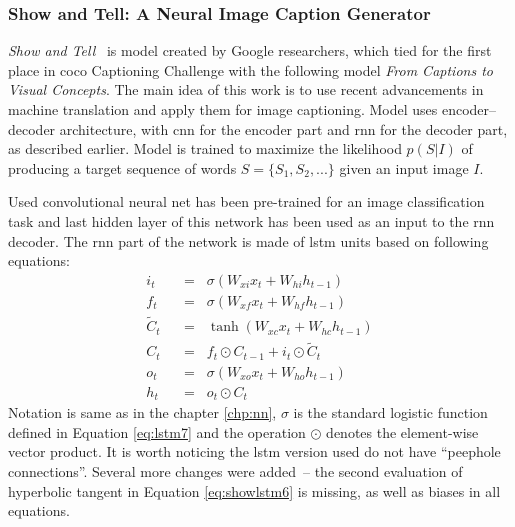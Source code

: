 \subsubsection{Show and Tell: A Neural Image Caption Generator}

\emph{Show and Tell}~\cite{DBLP:journals/corr/VinyalsTBE14} is model created by Google researchers, which tied for the first place in \gls{coco} Captioning Challenge with the following model \emph{From Captions to Visual Concepts}. The main idea of this work is to use recent advancements in machine translation and apply them for image captioning. Model uses encoder--decoder architecture, with \gls{cnn} for the encoder part and \gls{rnn} for the decoder part, as described earlier. Model is trained to maximize the likelihood $ p(S|I) $ of producing a target sequence of words $ S = \{S_1,S_2,...\} $ given an input image $ I $.

Used convolutional neural net has been pre-trained for an image classification task and last hidden layer of this network has been used as an input to the \gls{rnn} decoder. The \gls{rnn} part of the network is made of \gls{lstm} units based on following equations:
\begin{align}
i_t \hspace{7pt}&=\hspace{7pt} \sigma(W_{xi}x_t + W_{hi}h_{t-1}) \label{eq:showlstm1}\\
f_t \hspace{7pt}&=\hspace{7pt} \sigma(W_{xf}x_t + W_{hf}h_{t-1}) \label{eq:showlstm2}\\
\widetilde{C}_t \hspace{7pt}&=\hspace{7pt} \tanh(W_{xc}x_t + W_{hc}h_{t-1}) \label{eq:showlstm3}\\
C_t \hspace{7pt}&=\hspace{7pt} f_t\odot C_{t-1} + i_t\odot \widetilde{C}_t \label{eq:showlstm4}\\
o_t \hspace{7pt}&=\hspace{7pt} \sigma(W_{xo}x_t + W_{ho}h_{t-1}) \label{eq:showlstm5}\\
h_t \hspace{7pt}&=\hspace{7pt} o_t\odot C_t \label{eq:showlstm6}
\end{align}
Notation is same as in the chapter \ref{chp:nn}, $ \sigma $ is the standard logistic function defined in Equation \eqref{eq:lstm7} and the operation $ \odot $ denotes the element-wise vector product. It is worth noticing the \gls{lstm} version used do not have \textquotedblleft peephole connections\textquotedblright. Several more changes were added~-- the second evaluation of hyperbolic tangent in Equation \eqref{eq:showlstm6} is missing, as well as biases in all equations.

